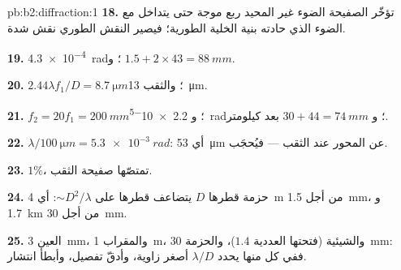 \begin{solution}{pb:b2:diffraction:1}
\textbf{18.} تؤخّر الصفيحة الضوء غير المحيد ربع موجة
حتى يتداخل مع الضوء الذي حادته بنية الخلية
الطورية؛ فيصير النقش الطوري نقش شدة.

\textbf{19.} \qty{4.3e-4}{rad}؛ و $1.5 + 2 \times 43 = \qty{88}{mm}$.

\textbf{20.} $2.44\lambda f_1/D = \qty{8.7}{\micro m}$؛ والثقب \qty{13}{\micro m}.

\textbf{21.} $f_2 = 20f_1 = \qty{200}{mm}$؛ و \qty{2.2e-5}{rad}؛ و $30 + 44 = \qty{74}{mm}$ بعد
كيلومتر.

\textbf{22.} $\lambda/\qty{100}{\micro m} = \qty{5.3e-3}{rad}$: أي \qty{53}{\micro m} عن المحور عند
الثقب --- فيُحجَب.

\textbf{23.} $1\%$، تمتصّها صفيحة الثقب.

\textbf{24.} حزمة قطرها $D$ يتضاعف قطرها على $\sim D^2/\lambda$: أي \qty{4}{m} من أجل
\qty{1.5}{mm}، و \qty{1.7}{km} من أجل \qty{30}{mm}.

\textbf{25.} العين \qty{3}{mm}، والمقراب \qty{1}{m}، والشيئية (فتحتها العددية $1.4$)، والحزمة
\qty{30}{mm}: ففي كل منها يحدد $\lambda/D$ أصغر زاوية، وأدقّ تفصيل،
وأبطأ انتشار.
\end{solution}
